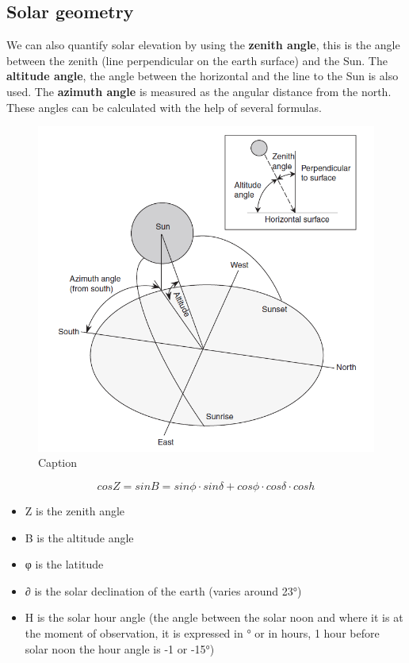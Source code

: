 \documentclass[12pt,oneside]{book}
\providecommand{\tightlist}{%
  \setlength{\itemsep}{0pt}\setlength{\parskip}{0pt}}
\begin{document}
\subsection{Solar geometry}\label{solar-geometry}

We can also quantify solar elevation by using the \textbf{zenith angle},
this is the angle between the zenith (line perpendicular on the earth
surface) and the Sun. The \textbf{altitude angle}, the angle between the
horizontal and the line to the Sun is also used. The \textbf{azimuth
angle} is measured as the angular distance from the north. These angles
can be calculated with the help of several formulas.

\begin{figure}

{\centering \includegraphics[width=0.8\linewidth]{figures/Figure212} 

}

\caption{Caption}\label{fig:SolarGeom}
\end{figure}

\begin{equation} 
  cos Z = sin B = sin \phi \cdot sin \delta + cos \phi \cdot cos \delta \cdot cos h
   \label{eq:Eqangles}
\end{equation}

\begin{itemize}
\tightlist
\item
  Z is the zenith angle
\item
  B is the altitude angle
\item
  φ is the latitude
\item
  ∂ is the solar declination of the earth (varies around 23°)
\item
  H is the solar hour angle (the angle between the solar noon and where
  it is at the moment of observation, it is expressed in ° or in hours,
  1 hour before solar noon the hour angle is -1 or -15°)
\end{itemize}
\end{document}
